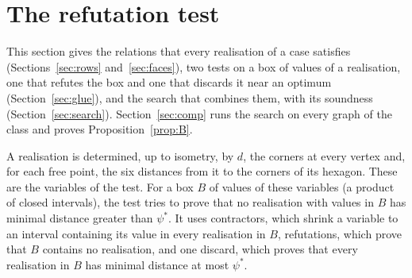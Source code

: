 \documentclass[12pt]{amsart}
\theoremstyle{definition}
\theoremstyle{plain}
\theoremstyle{definition}
\newcommand{\psis}{\psi^{*}}
\begin{document}
\section{The refutation test}\label{sec:kill}

This section gives the relations that every realisation of a case satisfies (Sections~\ref{sec:rows} and~\ref{sec:faces}), two tests on a box of values of a realisation, one that refutes the box and one that discards it near an optimum (Section~\ref{sec:glue}), and the search that combines them, with its soundness (Section~\ref{sec:search}). Section~\ref{sec:comp} runs the search on every graph of the class and proves Proposition~\ref{prop:B}.

A realisation is determined, up to isometry, by $d$, the corners at every vertex and, for each free point, the six distances from it to the corners of its hexagon. These are the variables of the test. For a box $B$ of values of these variables (a product of closed intervals), the test tries to prove that no realisation with values in $B$ has minimal distance greater than $\psis$. It uses contractors, which shrink a variable to an interval containing its value in every realisation in $B$, refutations, which prove that $B$ contains no realisation, and one discard, which proves that every realisation in $B$ has minimal distance at most $\psis$.
\end{document}

